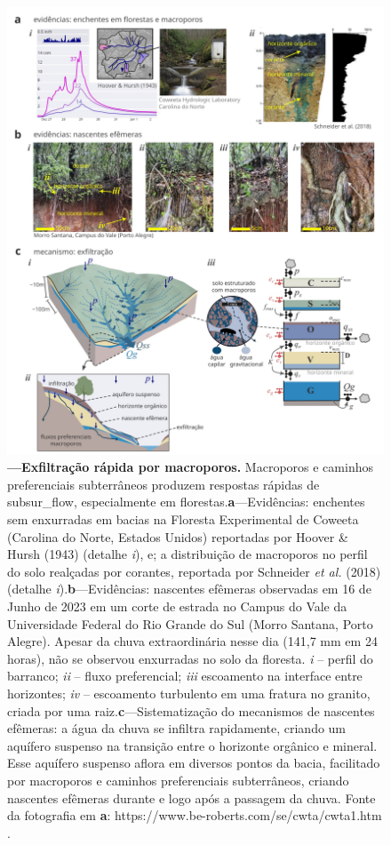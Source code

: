 \documentclass[./main.tex]{subfiles}
\begin{document}
\begin{figure}[t!] 
\centering				
\includegraphics[width=0.98\linewidth]{figs/fig_macropores.jpg}		
\caption[Exfiltração rápida por macroporos]
{\textbf{---\;Exfiltração rápida por macroporos.}
    Macroporos e caminhos preferenciais subterrâneos produzem respostas rápidas de \gls{subsur_flow}, especialmente em florestas.\;\textbf{a}\;---\;Evidências: enchentes sem enxurradas em bacias na Floresta Experimental de Coweeta (Carolina do Norte, Estados Unidos) reportadas por Hoover \& Hursh (1943) \cite{Hoover1943} (detalhe \textrm{\textit{i}}), e; a distribuição de macroporos no perfil do solo realçadas por corantes, reportada por Schneider \textit{et al.} (2018) \cite{Schneider2018} (detalhe \textrm{\textit{i}}).\;\textbf{b}\;---\;Evidências: nascentes efêmeras observadas em 16 de Junho de 2023 em um corte de estrada no Campus do Vale da Universidade Federal do Rio Grande do Sul (Morro Santana, Porto Alegre). Apesar da chuva extraordinária nesse dia (141,7 mm em 24 horas), não se observou enxurradas no solo da floresta. \textrm{\textit{i}} -- perfil do barranco; \textrm{\textit{ii}} -- fluxo preferencial; \textrm{\textit{iii}} escoamento na interface entre horizontes; \textrm{\textit{iv}} -- escoamento turbulento em uma fratura no granito, criada por uma raiz.\;\textbf{c}\;---\;Sistematização do mecanismos de nascentes efêmeras: a água da chuva se infiltra rapidamente, criando um aquífero suspenso na transição entre o horizonte orgânico e mineral. Esse aquífero suspenso aflora em diversos pontos da bacia, facilitado por macroporos e caminhos preferenciais subterrâneos, criando nascentes efêmeras durante e logo após a passagem da chuva. Fonte da fotografia em \textbf{a}: https://www.be-roberts.com/se/cwta/cwta1.htm .
}
\label{fig:hydro:macro} 		
\end{figure}
\end{document}
